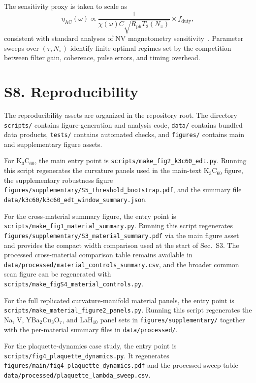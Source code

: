 \documentclass[12pt]{article}
\begin{document}
The sensitivity proxy is taken to scale as
\begin{equation}
\eta_{\mathrm{AC}}(\omega)
\propto
\frac{1}{\chi(\omega)C\sqrt{R_{\mathrm{ph}}T_2(N_{\pi})}}
\times f_{\mathrm{duty}},
\end{equation}
consistent with standard analyses of NV magnetometry sensitivity~\cite{Degen2017,Barry2020}.
Parameter sweeps over $(\tau,N_{\pi})$ identify finite optimal regimes set by
the competition between filter gain, coherence, pulse errors, and timing overhead.

\section*{S8. Reproducibility}

The reproducibility assets are organized in the repository root. The directory
\texttt{scripts/} contains figure-generation and analysis code, \texttt{data/}
contains bundled data products, \texttt{tests/} contains automated checks, and
\texttt{figures/} contains main and supplementary figure assets.

For K$_3$C$_{60}$, the main entry point is
\texttt{scripts/make\_fig2\_k3c60\_edt.py}. Running this script regenerates the
curvature panels used in the main-text K$_3$C$_{60}$ figure, the supplementary
robustness figure \texttt{figures/supplementary/S5\_threshold\_bootstrap.pdf},
and the summary file \texttt{data/k3c60/k3c60\_edt\_window\_summary.json}.

For the cross-material summary figure, the entry point is
\texttt{scripts/make\_fig1\_material\_summary.py}. Running this script
regenerates \texttt{figures/supplementary/S3\_material\_summary.pdf} via the
main figure asset and provides the compact width comparison used at the start of
Sec.~S3. The processed cross-material comparison table remains available in
\texttt{data/processed/material\_controls\_summary.csv}, and the broader common
scan figure can be regenerated with
\texttt{scripts/make\_figS4\_material\_controls.py}.

For the full replicated curvature-manifold material panels, the entry point is
\texttt{scripts/make\_material\_figure2\_panels.py}. Running this script
regenerates the Na, V, YBa$_2$Cu$_3$O$_7$, and LaH$_{10}$ panel sets in
\texttt{figures/supplementary/} together with the per-material summary files in
\texttt{data/processed/}.

For the plaquette-dynamics case study, the entry point is
\texttt{scripts/fig4\_plaquette\_dynamics.py}. It regenerates
\texttt{figures/main/fig4\_plaquette\_dynamics.pdf} and the processed sweep
table \texttt{data/processed/plaquette\_lambda\_sweep.csv}.
\end{document}

